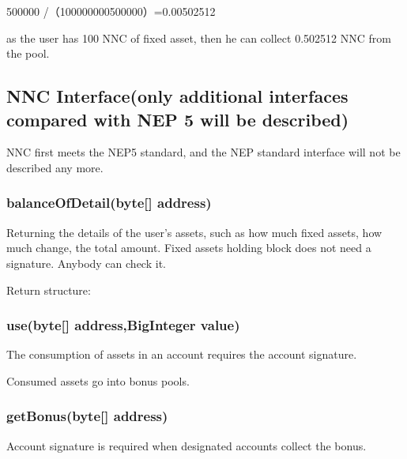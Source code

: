 \documentclass[letterpaper,10pt,english]{sphinxmanual}
\begin{document}
%
\begin{sphinxVerbatim}[commandchars=\\\{\}]
500000 /（100000000\PYGZhy{}500000）=0.00502512
\end{sphinxVerbatim}

as the user has 100 NNC of fixed asset, then he can collect 0.502512 NNC from the pool.


\subsection{NNC Interface(only additional interfaces compared with NEP 5 will be described)}
\label{\detokenize{nns_protocol:nnc-interface-only-additional-interfaces-compared-with-nep-5-will-be-described}}
NNC first meets the NEP5 standard, and the NEP standard interface will not be described any more.


\subsubsection{balanceOfDetail(byte{[}{]} address)}
\label{\detokenize{nns_protocol:balanceofdetail-byte-address}}
Returning the details of the user’s assets, such as how much fixed assets, how much change, the total amount.
Fixed assets holding block does not need a signature. Anybody can check it.

Return structure:

%
\begin{sphinxVerbatim}[commandchars=\\\{\}]
     
        
          
        
\end{sphinxVerbatim}


\subsubsection{use(byte{[}{]} address,BigInteger value)}
\label{\detokenize{nns_protocol:use-byte-address-biginteger-value}}
The consumption of assets in an account requires the account signature.

Consumed assets go into bonus pools.


\subsubsection{getBonus(byte{[}{]} address)}
\label{\detokenize{nns_protocol:getbonus-byte-address}}
Account signature is required when designated accounts collect the bonus.
\end{document}
